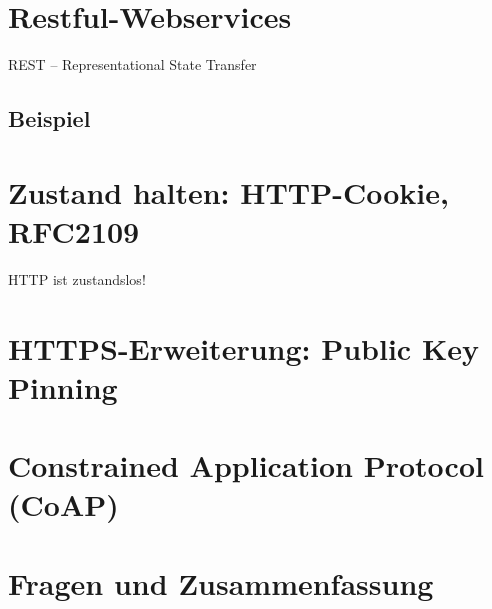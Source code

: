 \section{Restful-Webservices}
REST -- Representational State Transfer
\subsection*{Beispiel}
\section{Zustand halten: HTTP-Cookie, RFC2109}
HTTP ist zustandslos!
\section{HTTPS-Erweiterung: Public Key Pinning}
\section{Constrained Application Protocol (CoAP)}
\section{Fragen und Zusammenfassung}
